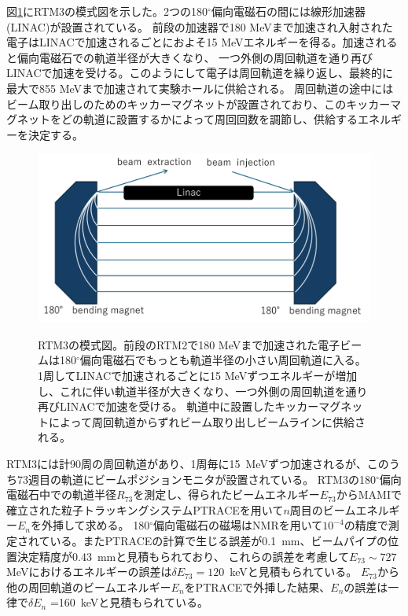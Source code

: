 \documentclass[a4paper,11pt,uplatex]{jsbook}
\begin{document}
図\ref{RTM3}にRTM3の模式図を示した。2つの180$^\circ$偏向電磁石の間には線形加速器(LINAC)が設置されている。
前段の加速器で180 MeVまで加速され入射された電子はLINACで加速されるごとにおよそ15 MeVエネルギーを得る。加速されると偏向電磁石での軌道半径が大きくなり、
一つ外側の周回軌道を通り再びLINACで加速を受ける。このようにして電子は周回軌道を繰り返し、最終的に最大で855 MeVまで加速されて実験ホールに供給される。
周回軌道の途中にはビーム取り出しのためのキッカーマグネットが設置されており、このキッカーマグネットをどの軌道に設置するかによって周回回数を調節し、供給するエネルギーを決定する。
\begin{figure}[h]
  \centering
  \includegraphics[width=0.8\linewidth]{image/3-RTM.png}\\
  \caption[RTM3の模式図]{RTM3の模式図。前段のRTM2で180 MeVまで加速された電子ビームは180$^\circ$偏向電磁石でもっとも軌道半径の小さい周回軌道に入る。
  1周してLINACで加速されるごとに15 MeVずつエネルギーが増加し、これに伴い軌道半径が大きくなり、一つ外側の周回軌道を通り再びLINACで加速を受ける。
  軌道中に設置したキッカーマグネットによって周回軌道からずれビーム取り出しビームラインに供給される。}
  \label{RTM3}
\end{figure}

RTM3には計90周の周回軌道があり、1周毎に15~MeVずつ加速されるが、このうち73週目の軌道にビームポジションモニタが設置されている。
RTM3の180$^\circ$偏向電磁石中での軌道半径$R_{73}$を測定し、得られたビームエネルギー$E_{73}$からMAMIで確立された粒子トラッキングシステムPTRACE\cite{ratschow}を用いて$n$周目のビームエネルギー$E_n$を外挿して求める。
180$^\circ$偏向電磁石の磁場はNMRを用いて$10^{-4}$の精度で測定されている。またPTRACEの計算で生じる誤差が0.1~mm、ビームパイプの位置決定精度が0.43~mmと見積もられており、
これらの誤差を考慮して$E_{73}\sim 727~$MeVにおけるエネルギーの誤差は$\delta E_{73} =120$~keVと見積もられている\cite{jankowiak}。
$E_{73}$から他の周回軌道のビームエネルギー$E_n$をPTRACEで外挿した結果、$E_n$の誤差は一律で$\delta E_n$ =160~keVと見積もられている\cite{herter}。
\end{document}
